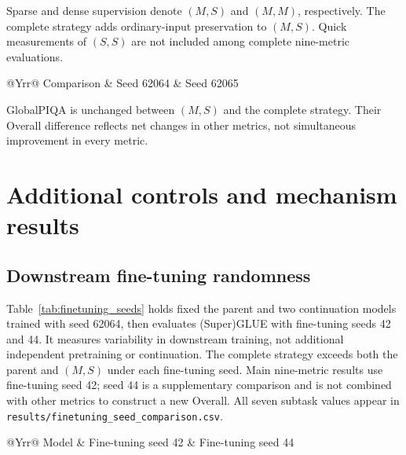Sparse and dense supervision denote $(M,S)$ and $(M,M)$, respectively. The complete strategy adds ordinary-input preservation to $(M,S)$. Quick measurements of $(S,S)$ are not included among complete nine-metric evaluations.

\begin{table}[htbp]
\caption{Principal Overall differences. The complete strategy includes additional preservation presentations.}
\begin{tabularx}{\linewidth}{@{}Yrr@{}}
\toprule Comparison & Seed 62064 & Seed 62065\\\midrule

\end{tabularx}
\end{table}

GlobalPIQA is unchanged between $(M,S)$ and the complete strategy. Their Overall difference reflects net changes in other metrics, not simultaneous improvement in every metric.

\par\FloatBarrier{}
\section{Additional controls and mechanism results}
\label{app:extended}

\subsection{Downstream fine-tuning randomness}

Table~\ref{tab:finetuning_seeds} holds fixed the parent and two continuation models trained with seed 62064, then evaluates (Super)GLUE with fine-tuning seeds 42 and 44. It measures variability in downstream training, not additional independent pretraining or continuation. The complete strategy exceeds both the parent and $(M,S)$ under each fine-tuning seed. Main nine-metric results use fine-tuning seed 42; seed 44 is a supplementary comparison and is not combined with other metrics to construct a new Overall. All seven subtask values appear in \nolinkurl{results/finetuning_seed_comparison.csv}.

\begin{table}[htbp]
\caption{(Super)GLUE under two fine-tuning seeds with model weights held fixed. Scores are equal-weight means of the seven primary subtask metrics. Both continuation strategies use continuation seed 62064.}
\label{tab:finetuning_seeds}
\small
\begin{tabularx}{\linewidth}{@{}Yrr@{}}
\toprule Model & Fine-tuning seed 42 & Fine-tuning seed 44\\\midrule

\end{tabularx}
\end{table}

